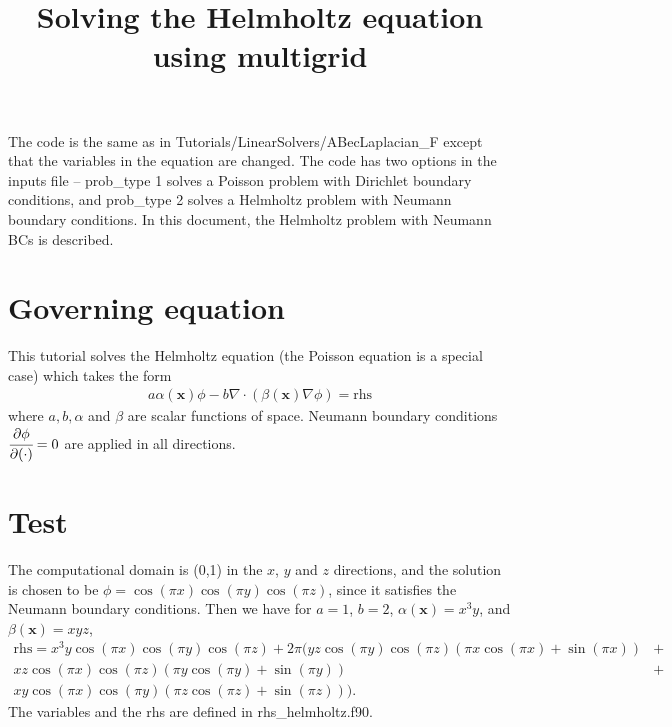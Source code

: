 \documentclass[]{article}
\title{Solving the Helmholtz equation using multigrid}
\begin{document}
\maketitle
The code is the same as in Tutorials/LinearSolvers/ABecLaplacian\_F except that the variables in the equation are changed. The code has two options in the inputs file --  prob\_type 1 solves a Poisson problem with Dirichlet boundary conditions, and prob\_type 2 solves a Helmholtz problem with Neumann boundary conditions. In this document, the Helmholtz problem with Neumann BCs is described. 
\section{Governing equation}
This tutorial solves the Helmholtz equation (the Poisson equation is a special case) which takes the form
\begin{eqnarray*}
a\alpha(\bm{x})\phi - b\nabla\cdot(\beta(\bm{x})\nabla\phi)=\mathrm{rhs}
\end{eqnarray*}
where $a, b, \alpha$ and $\beta$ are scalar functions of space. Neumann boundary conditions $\cfrac{\partial\phi}{\partial(\cdot)}=0$ are applied in all directions.
\section{Test}
The computational domain is (0,1) in the $x$, $y$ and $z$ directions, and the solution is chosen to be $\phi=\cos(\pi x)\cos(\pi y)\cos(\pi z)$, since it satisfies the Neumann boundary conditions. Then we have for $a=1$, $b=2$, $\alpha(\bm{x})=x^3y$, and $\beta(\bm{x})=xyz$,
\begin{eqnarray*}
\mathrm{rhs}=x^3y\cos(\pi x)\cos(\pi y)\cos(\pi z)+2\pi(yz\cos(\pi y)\cos(\pi z)(\pi x\cos(\pi x)+\sin(\pi x))&+&\\
					            xz\cos(\pi x)\cos(\pi z)(\pi y\cos(\pi y)+\sin(\pi y))&+&\\
					            xy\cos(\pi x)\cos(\pi y)(\pi z\cos(\pi z)+\sin(\pi z))).
\end{eqnarray*}
The variables and the rhs are defined in rhs\_helmholtz.f90. 
\end{document}
